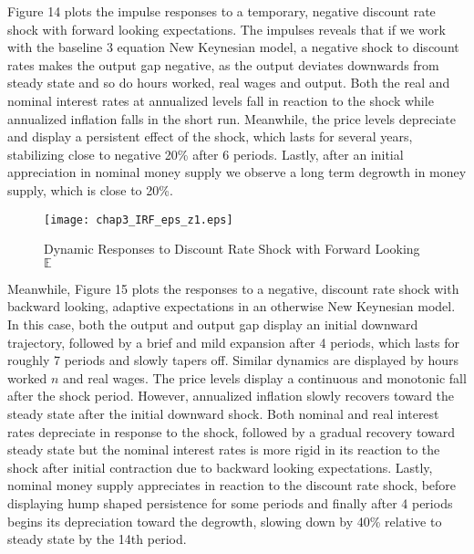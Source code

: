 \documentclass[12pt]{article}
\newcommand{\1}{\mathbbm 1}
\begin{document}
Figure 14 plots the impulse responses to a temporary, negative discount rate shock with forward looking expectations. The impulses reveals that if we work with the baseline 3 equation New Keynesian model, a negative shock to discount rates makes the output gap negative, as the output deviates downwards from steady state and so do hours worked, real wages and output. Both the real and nominal interest rates at annualized levels fall in reaction to the shock while annualized inflation falls in the short run. Meanwhile, the price levels depreciate and display a persistent effect of the shock, which lasts for several years, stabilizing close to negative 20\% after 6 periods. Lastly, after an initial appreciation in nominal money supply we observe a long term degrowth in money supply, which is close to 20\%.








	

	
	
	\begin{figure}[H]
		\begin{center}
			\texttt{[image: chap3\_IRF\_eps\_z1.eps]}
		\end{center}
		\caption{Dynamic Responses to Discount Rate Shock with Forward Looking $\mathbb{E}$}
	\end{figure}


Meanwhile, Figure 15 plots the responses to a negative, discount rate shock with backward looking, adaptive expectations in an otherwise New Keynesian model. In this case, both the output and output gap display an initial downward trajectory, followed by a brief and mild expansion after 4 periods, which lasts for roughly 7 periods and slowly tapers off. Similar dynamics are displayed by hours worked $n$ and real wages. The price levels display a continuous and monotonic fall after the shock period. However, annualized inflation slowly recovers toward the steady state after the initial downward shock. Both nominal and real interest rates depreciate in response to the shock, followed by a gradual recovery toward steady state but the nominal interest rates is more rigid in its reaction to the shock after initial contraction due to backward looking expectations. Lastly, nominal money supply appreciates in reaction to the discount rate shock, before displaying hump shaped persistence for some periods and finally after 4 periods begins its depreciation toward the degrowth, slowing down by 40\% relative to steady state by the 14th period.
\end{document}
